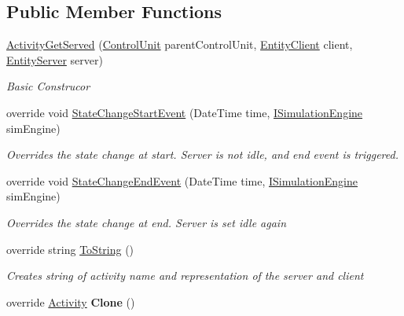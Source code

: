 \subsection*{Public Member Functions}
\begin{DoxyCompactItemize}
\item 
\hyperlink{class_simple_queue_example_1_1_model_elements_1_1_activity_get_served_a5e5b0aedb894812d293aadf902458594}{Activity\+Get\+Served} (\hyperlink{class_simulation_core_1_1_h_c_c_m_elements_1_1_control_unit}{Control\+Unit} parent\+Control\+Unit, \hyperlink{class_simple_queue_example_1_1_model_elements_1_1_entity_client}{Entity\+Client} client, \hyperlink{class_simple_queue_example_1_1_model_elements_1_1_entity_server}{Entity\+Server} server)
\begin{DoxyCompactList}\small\item\em Basic Construcor \end{DoxyCompactList}\item 
override void \hyperlink{class_simple_queue_example_1_1_model_elements_1_1_activity_get_served_a6011fc9410cc8ae7de6c1fd18ffb4e3f}{State\+Change\+Start\+Event} (Date\+Time time, \hyperlink{interface_simulation_core_1_1_simulation_classes_1_1_i_simulation_engine}{I\+Simulation\+Engine} sim\+Engine)
\begin{DoxyCompactList}\small\item\em Overrides the state change at start. Server is not idle, and end event is triggered. \end{DoxyCompactList}\item 
override void \hyperlink{class_simple_queue_example_1_1_model_elements_1_1_activity_get_served_adb6ff5e1d6207a8e3386d5608c8b8297}{State\+Change\+End\+Event} (Date\+Time time, \hyperlink{interface_simulation_core_1_1_simulation_classes_1_1_i_simulation_engine}{I\+Simulation\+Engine} sim\+Engine)
\begin{DoxyCompactList}\small\item\em Overrides the state change at end. Server is set idle again \end{DoxyCompactList}\item 
override string \hyperlink{class_simple_queue_example_1_1_model_elements_1_1_activity_get_served_aeeaeca3bfcd739f31b995741f1c16dde}{To\+String} ()
\begin{DoxyCompactList}\small\item\em Creates string of activity name and representation of the server and client \end{DoxyCompactList}\item 
override \hyperlink{class_simulation_core_1_1_h_c_c_m_elements_1_1_activity}{Activity} {\bfseries Clone} ()\hypertarget{class_simple_queue_example_1_1_model_elements_1_1_activity_get_served_af61f1bf5f72994e0516bf6bdb2dc8fdf}{}\label{class_simple_queue_example_1_1_model_elements_1_1_activity_get_served_af61f1bf5f72994e0516bf6bdb2dc8fdf}

\end{DoxyCompactItemize}
